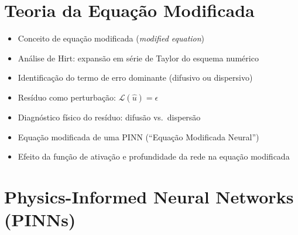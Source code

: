 \documentclass[12pt, a4paper]{article}
\begin{document}
\section*{Teoria da Equação Modificada}

\begin{itemize}
    \item Conceito de equação modificada (\textit{modified equation})
    \item Análise de Hirt: expansão em série de Taylor do esquema numérico
    \item Identificação do termo de erro dominante (difusivo ou dispersivo)
    \item Resíduo como perturbação: $\mathcal{L}(\hat{u}) = \epsilon$
    \item Diagnóstico físico do resíduo: difusão vs.\ dispersão
    \item Equação modificada de uma PINN (``Equação Modificada Neural'')
    \item Efeito da função de ativação e profundidade da rede na equação modificada
\end{itemize}

\section*{Physics-Informed Neural Networks (PINNs)}
\end{document}

